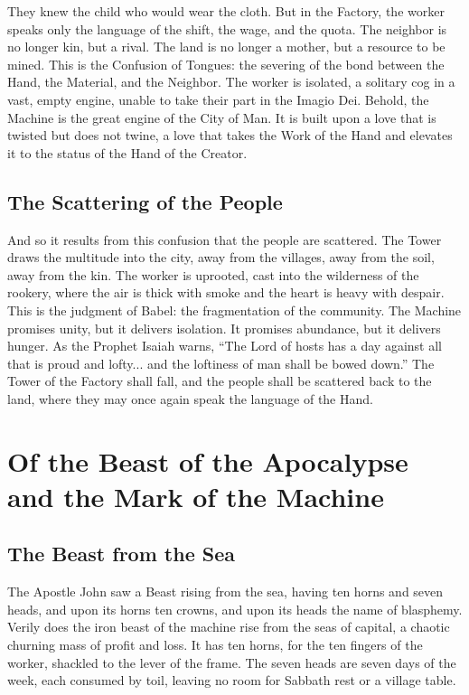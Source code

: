They knew the child who would wear the cloth.
But in the Factory, the worker speaks only the language of the shift, the wage, and the quota.
The neighbor is no longer kin, but a rival.
The land is no longer a mother, but a resource to be mined.
This is the Confusion of Tongues: the severing of the bond between the Hand, the Material, and the Neighbor.
The worker is isolated, a solitary cog in a vast, empty engine, unable to take their part in the Imagio Dei.
Behold, the Machine is the great engine of the City of Man.
It is built upon a love that is twisted but does not twine, a love that takes the Work of the Hand and elevates it to the status of the Hand of the Creator.

\subsection{The Scattering of the People}
And so it results from this confusion  that the people are scattered.
The Tower draws the multitude into the city, away from the villages, away from the soil, away from the kin.
The worker is uprooted, cast into the wilderness of the rookery, where the air is thick with smoke and the heart is heavy with despair.
This is the judgment of Babel: the fragmentation of the community.
The Machine promises unity, but it delivers isolation.
It promises abundance, but it delivers hunger.
As the Prophet Isaiah warns, ``The Lord of hosts has a day against all that is proud and lofty... and the loftiness of man shall be bowed down.'' 
The Tower of the Factory shall fall, and the people shall be scattered back to the land, where they may once again speak the language of the Hand.


\section{Of the Beast of the Apocalypse and the Mark of the Machine}

\subsection{The Beast from the Sea}
The Apostle John saw a Beast rising from the sea, having ten horns and seven heads, and upon its horns ten crowns, and upon its heads the name of blasphemy.
Verily does the iron beast of the machine rise from the seas of capital, a chaotic churning mass of profit and loss.
It has ten horns, for the ten fingers of the worker, shackled to the lever of the frame.
The seven heads are seven days of the week, each consumed by toil, leaving no room for Sabbath rest or a village table.

